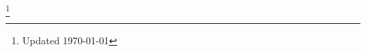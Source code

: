 \documentclass[margin]{res}
\begin{document}
\begin{resume}



\end{resume}
\let\thefootnote\relax\footnote{Updated \today}
\end{document}

